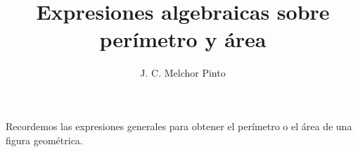 \documentclass[12pt]{guia}
\title{Expresiones algebraicas sobre perímetro y área}
\author{J. C. Melchor Pinto}
\begin{document}
\pagestyle{headandfoot}
\addpoints
\INFO
\printanswers
Recordemos las expresiones generales para obtener el perímetro o el área de una
figura geométrica.
\begin{questions}
    
    \newpage
    
    
    \newpage
    
    
    
    
    
    
    
    
    
    
    
    
    \newpage
    
    
    
\end{questions}

\end{document}
